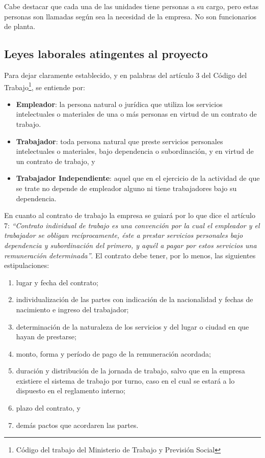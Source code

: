 Cabe destacar que cada una de las unidades tiene personas a su cargo, pero estas personas son llamadas
según sea la necesidad de la empresa. No son funcionarios de planta. 

\subsection{Leyes laborales atingentes al proyecto}

Para dejar claramente establecido, y en palabras del artículo 3 del Código del Trabajo\footnote{Código del
trabajo del Ministerio de Trabajo y Previsión Social}, se entiende por:

\begin{itemize}
  \item \textbf{Empleador}: la persona natural o jurídica que utiliza los servicios intelectuales o materiales
de una o más personas en virtud de un contrato de trabajo.
  \item \textbf{Trabajador}: toda persona natural que preste servicios personales intelectuales o materiales, bajo
dependencia o subordinación, y en virtud de un contrato de trabajo, y
  \item \textbf{Trabajador Independiente}: aquel que en el ejercicio de la actividad de que se trate no depende de 
empleador alguno ni tiene trabajadores bajo su dependencia.
\end{itemize}

En cuanto al contrato de trabajo la empresa se guiará por lo que dice el artículo 7: \emph{``Contrato individual de trabajo 
es una convención por la cual el empleador y el trabajador se obligan recíprocamente, éste a prestar servicios personales 
bajo dependencia y subordinación del primero, y aquél a pagar por estos servicios una remuneración determinada''}. El 
contrato debe tener, por lo menos, las siguientes estipulaciones:

\begin{enumerate}
  \item lugar y fecha del contrato;
  \item individualización de las partes con indicación de la nacionalidad y fechas de nacimiento e ingreso del trabajador;
  \item determinación de la naturaleza de los servicios y del lugar o ciudad en que hayan de prestarse;
  \item monto, forma y período de pago de la remuneración acordada;
  \item duración y distribución de la jornada de trabajo, salvo que en la empresa existiere el sistema de trabajo por turno, caso en el cual se estará a lo dispuesto en el reglamento interno;
  \item plazo del contrato, y
  \item demás pactos que acordaren las partes.
\end{enumerate}

